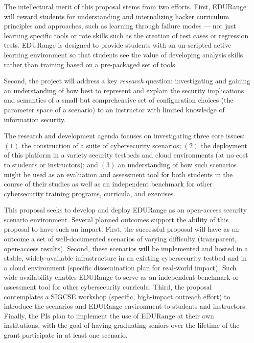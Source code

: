 \documentclass[11pt]{report}
\begin{document}
The intellectural merit of this proposal stems from two efforts.
First, EDURange will reward students for understanding and
internalizing hacker curriculum principles and approaches, such as
learning through failure modes --- not just learning specific tools or rote skills
such as the creation of test cases or regression tests.  EDURange is
designed to provide students with an un-scripted active learning
environment so that students see the value of developing analysis
skills rather than training based on a pre-packaged set of tools.

Second, the project will address a key {\em research} question:
investigating and gaining an understanding of how best to represent and explain the
security implications and semantics of a small but comprehensive set of
configuration choices (the parameter space of a scenario) to an
instructor with limited knowledge of information security.  

The research and development agenda focuses on investigating three
core issues: $(1)$ the construction of a suite of cybersecurity
scenarios; $(2)$ the deployment of this platform in a variety security
testbeds and cloud environments (at no cost to students or
instructors); and $(3)$ an understanding of how such scenarios might
be used as an evaluation and assessment tool for both students in the
course of their studies as well as an independent benchmark for other
cybersecurity training programs, curricula, and exercises.

This proposal seeks to develop and
deploy EDURange as an open-access security scenario environment.
Several planned outcomes support the ability of this proposal to have
such an impact.  First, the successful proposal will have as an
outcome a set of well-documented scenarios of varying difficulty
(transparent, open-access results).  Second, these scenarios will be
implemented and hosted in a stable, widely-available infrastructure in
an existing cybersecurity testbed and in a cloud environment (specific
dissemination plan for real-world impact).  Such wide availability
enables EDURange to serve as an independent benchmark or assessment
tool for other cybersecurity curricula.  Third, the proposal
contemplates a SIGCSE workshop (specific, high-impact outreach effort)
to introduce the scenarios and EDURange environment to students and
instructors. Finally, the PIs plan to implement the use of EDURange at
their own institutions, with the goal of having graduating seniors
over the lifetime of the grant participate in at least one scenario.
\end{document}
